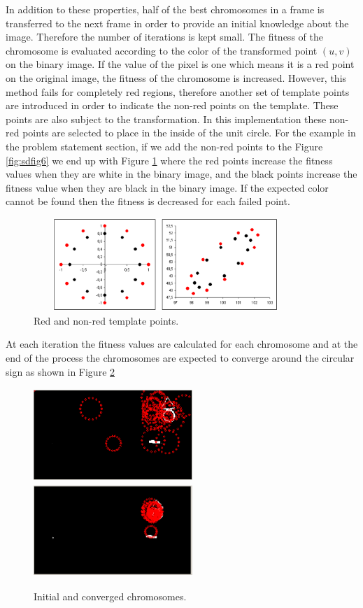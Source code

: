 \documentclass[a4paper,oneside,12pt]{report}
\begin{document}
In addition to these properties, half of the best chromosomes in a frame is transferred to the next frame in order to provide an initial knowledge about the image. Therefore the number of iterations is kept small. The fitness of the chromosome is evaluated according to the color of the transformed point $(u,v)$ on the binary image. If the value of the pixel is one which means it is a red point on the original image, the fitness of the chromosome is increased. However, this method fails for completely red regions, therefore another set of template points are introduced in order to indicate the non-red points on the template. These points are also subject to the transformation. In this implementation these non-red points are selected to place in the inside of the unit circle. For the example in the problem statement section, if we add the non-red points to the Figure \ref{fig:sdfig6} we end up with Figure \ref{fig:sdfig7} where the red points increase the fitness values when they are white in the binary image, and the black points increase the fitness value when they are black in the binary image. If the expected color cannot be found then the fitness is decreased for each failed point.
\begin{figure}[ht]
\begin{center}
\includegraphics[width=100mm,height=35mm]{img/sdfig7.eps}
\caption{Red and non-red template points.}
\label{fig:sdfig7}
\end{center}
\end{figure}
\par
At each iteration the fitness values are calculated for each chromosome and at the end of the process the chromosomes are expected to converge around the circular sign as shown in Figure \ref{fig:sdfig4}
\begin{figure}[ht]
\begin{center}
\includegraphics[width=60mm,height=35mm]{img/sdfig3.eps}
\includegraphics[width=60mm,height=35mm]{img/sdfig4.eps}
\caption{Initial and converged chromosomes.}
\label{fig:sdfig4}
\end{center}
\end{figure}
\end{document}
